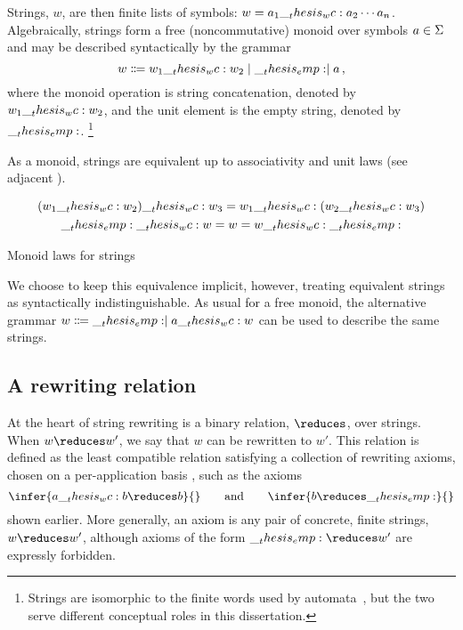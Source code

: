 Strings, $w$, are then finite lists of symbols: $w = a_1 \wc a_2 \dotsb a_n$.
Algebraically, strings form a free (noncommutative) monoid over symbols $a \in \Sigma$ and may be described syntactically by the grammar
\begin{equation*}
  w \Coloneqq w_1 \wc w_2 \mid \emp \mid a
  \,,
\end{equation*}
where the monoid operation is string concatenation, denoted by $w_1 \wc w_2$, and the unit element is the empty string, denoted by $\__thesis_emp:$.%
\footnote[][-2.25\baselineskip]{Strings are isomorphic to the finite words used by automata~, but the two serve different conceptual roles in this dissertation.}

As a monoid, strings are equivalent up to associativity and unit laws (see adjacent ).%
\begin{marginfigure}
  \begin{gather*}
    (w_1 \wc w_2) \wc w_3 = w_1 \wc (w_2 \wc w_3) \\
    \emp \wc w = w = w \wc \emp
  \end{gather*}
  \caption{Monoid laws for strings}\label{fig:string-rewriting:monoid-laws}
\end{marginfigure}
We choose to keep this equivalence implicit, however, treating equivalent strings as syntactically indistinguishable.
As usual for a free monoid, the alternative grammar
    $w \Coloneqq \emp \mid a \wc w$
can be used to   describe the same strings.



\subsection{A rewriting relation}

At the heart of string rewriting is a binary relation, $\reduces$, over strings.
When $w \reduces w'$, we say that $w$ can be rewritten to $w'$.
This relation is defined as the least compatible relation satisfying a collection of rewriting axioms, chosen on a per-application basis%
, such as the axioms
\begin{equation*}%
  \infer{a \wc b \reduces b}{}
  \qquad\text{and}\qquad
  \infer{b \reduces \emp}{}
\end{equation*}
shown earlier.
More generally, an axiom is any pair of concrete, finite strings, $w \reduces w'$, although axioms of the form $\emp \reduces w'$ are expressly forbidden.

